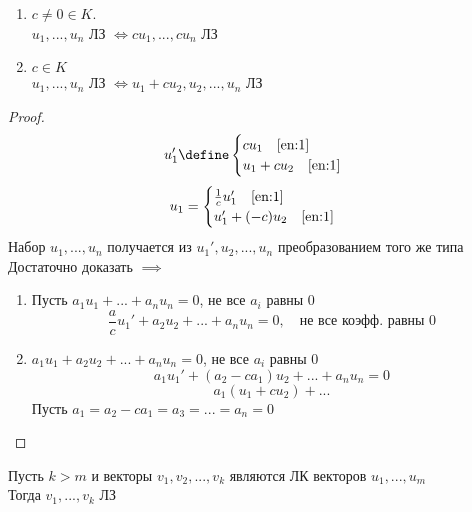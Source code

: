 \begin{props}
\begin{enumerate}
        \item \label{en:1} $ c \ne 0 \in K$. \\
        $u_1, ..., u_n$ ЛЗ $\iff cu_1, ..., cu_n$ ЛЗ
        \item \label{en:2} $c \in K$ \\
        $u_1, ..., u_n$ ЛЗ $\iff u_1 + cu_2, u_2, ..., u_n $ ЛЗ
    \end{enumerate}
    \begin{proof}
    	$$ u_1' \define
        \begin{cases}
            cu_1 \quad \eqref{en:1} \\
            u_1 + cu_2 \quad \eqref{en:1}
        \end{cases} $$
        $$ u_1 =
        \begin{cases}
            \frac1cu_1' \quad \eqref{en:1} \\
            u_1' + (-c)u_2 \quad \eqref{en:1}
        \end{cases} $$
        Набор $u_1, ..., u_n$ получается из $u_1', u_2, ..., u_n$ преобразованием того же типа \\
        Достаточно доказать $\implies$
        \begin{enumerate}
        	\item Пусть $a_1u_1 + ... + a_nu_n = 0$, не все $a_i$ равны 0
            $$ \frac{a}c u_1' + a_2u_2 + ... + a_nu_n = 0, \quad \text{не все коэфф. равны 0} $$
            \item $a_1u_1 + a_2u_2 + ... + a_nu_n = 0$, не все $a_i$ равны 0
            $$ a_1u_1' + (a_2 - ca_1)u_2 + ... + a_nu_n = 0 $$
            $$ a_1(u_1 + cu_2) + ... $$
            Пусть $ a_1 = a_2 - ca_1 = a_3 = ... = a_n = 0 $
        \end{enumerate}
    \end{proof}
\end{props}

\begin{theorem}
	Пусть $k > m$ и векторы $v_1, v_2, ..., v_k$ являются ЛК векторов $u_1, ..., u_m$ \\
    Тогда $v_1, ..., v_k$ ЛЗ
\end{theorem}

